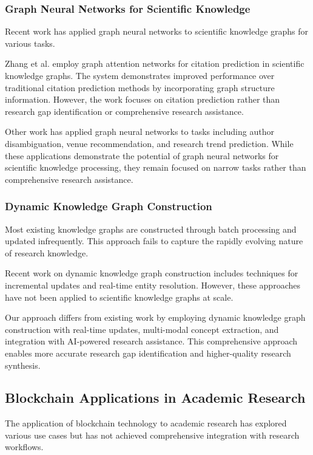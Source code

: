 \documentclass[10pt,twocolumn]{article}
\begin{document}
\subsubsection{Graph Neural Networks for Scientific Knowledge}

Recent work has applied graph neural networks to scientific knowledge graphs for various tasks.

Zhang et al. \cite{zhang2022scientific} employ graph attention networks for citation prediction in scientific knowledge graphs. The system demonstrates improved performance over traditional citation prediction methods by incorporating graph structure information. However, the work focuses on citation prediction rather than research gap identification or comprehensive research assistance.

Other work has applied graph neural networks to tasks including author disambiguation, venue recommendation, and research trend prediction. While these applications demonstrate the potential of graph neural networks for scientific knowledge processing, they remain focused on narrow tasks rather than comprehensive research assistance.

\subsubsection{Dynamic Knowledge Graph Construction}

Most existing knowledge graphs are constructed through batch processing and updated infrequently. This approach fails to capture the rapidly evolving nature of research knowledge.

Recent work on dynamic knowledge graph construction includes techniques for incremental updates and real-time entity resolution. However, these approaches have not been applied to scientific knowledge graphs at scale.

Our approach differs from existing work by employing dynamic knowledge graph construction with real-time updates, multi-modal concept extraction, and integration with AI-powered research assistance. This comprehensive approach enables more accurate research gap identification and higher-quality research synthesis.

\subsection{Blockchain Applications in Academic Research}

The application of blockchain technology to academic research has explored various use cases but has not achieved comprehensive integration with research workflows.
\end{document}
